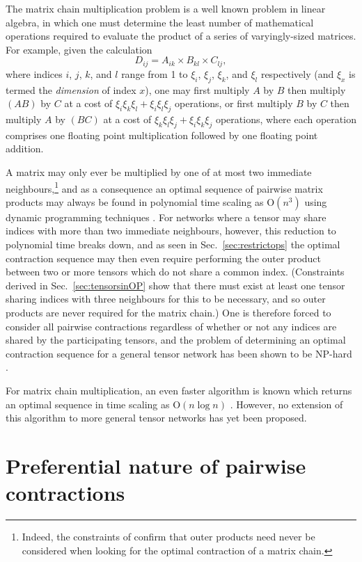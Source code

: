 \documentclass[aps,pre,reprint,superscriptaddress,amsfonts,amsmath,showpacs,nofootinbib,floatfix]{revtex4-1}
\newcommand{\mrm}[1]{\mathrm{#1}}
\newcommand{\sref}[1]{Sec.~\ref{#1}}
\newcommand{\psref}[1]{\protect{Sec.~\ref{#1}}}
\newcommand{\OO}[1]{\mrm{O}(#1)}
\begin{document}
The matrix chain multiplication problem is a well known problem in linear algebra, in which one must determine the least number of mathematical operations required to evaluate the product of a series of varyingly-sized matrices.
For example, given the calculation
\begin{equation}
D_{ij} = A_{ik}\times B_{kl}\times C_{lj},
\end{equation}
where indices $i$, $j$, $k$, and $l$ range from 1 to $\xi_i$, $\xi_j$, $\xi_k$, and $\xi_l$ respectively (and $\xi_x$ is termed the \emph{dimension} of index $x$),
one may first multiply $A$ by $B$ then multiply $(AB)$ by $C$ at a cost of $\xi_i\xi_k\xi_l+\xi_i\xi_l\xi_j$ operations, or first multiply $B$ by $C$ then multiply $A$ by $(BC)$ at a cost of $\xi_k\xi_l\xi_j+\xi_i\xi_k\xi_j$ operations, where each operation comprises one floating point multiplication followed by one floating point addition.

A matrix may only ever be multiplied by one of at most two immediate neighbours,\footnote{Indeed, the constraints of \psref{sec:restrictops} confirm that outer products need never be considered when looking for the optimal contraction of a matrix chain.} and as a consequence an optimal sequence of pairwise matrix products may always be found in polynomial time scaling as $\OO{n^3}$ using dynamic programming techniques \cite{cormen2001}. 
For networks where a tensor may share indices with more than two immediate neighbours, however, this reduction to polynomial time breaks down, and as seen in \sref{sec:restrictops} the optimal contraction sequence may then even require performing the outer product between two or more tensors which do not share a common index. 
(Constraints derived in \sref{sec:tensorsinOP} show that there must exist at least one tensor sharing indices with three neighbours for this to be necessary, and so outer products are never required for the matrix chain.) 
One is therefore forced to consider all pairwise contractions regardless of whether or not any indices are shared by the participating tensors, and the problem of determining an optimal contraction sequence for a general tensor network has been shown to be NP-hard \cite{lam1997}. 

For matrix chain multiplication, an even faster algorithm is known which returns an optimal sequence in time scaling as $\OO{n\log{n}}$ \cite{hu1982,hu1984}. However, no extension of this algorithm to more general tensor networks has yet been proposed.


\section{Preferential nature of pairwise contractions\label{sec:pairwise}}
\end{document}

